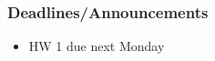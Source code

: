 
\begin{frame}
    \frametitle{Deadlines/Announcements}
    \begin{itemize}
        \item HW 1 due next Monday
    \end{itemize}
\end{frame}
